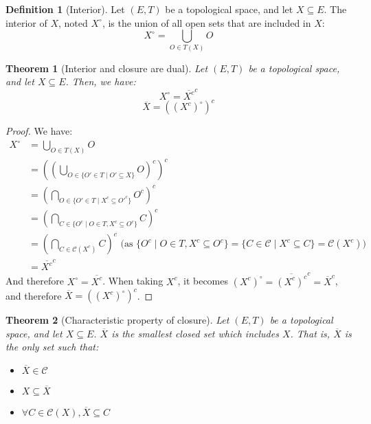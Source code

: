 \documentclass{article}
\newtheorem{theorem}{Theorem}[section]
\theoremstyle{definition}
\newtheorem{definition}{Definition}[section]
\theoremstyle{remark}
\theoremstyle{example}
\theoremstyle{notation}
\newcommand{\inter}[1]{{{#1}^\circ}}
\newcommand{\closed}{\mathcal{C}}
\newcommand{\lr}[1]{\left(#1\right)}
\begin{document}
\begin{definition}[Interior]
		Let $(E, T)$ be a topological space, and let $X \subseteq E$. The interior of $X$, noted $\inter{X}$, is the union of all open sets that are included in $X$:
				$$\inter{X} = \bigcup_{O \in T(X)} O$$
\end{definition}

\begin{theorem}[Interior and closure are dual]
		Let $(E, T)$ be a topological space, and let $X \subseteq E$. Then, we have:
				$$\inter{X} = \overline{X^c}^c$$
				$$\overline{X} = (\inter{(X^c)})^c$$
\end{theorem}

\begin{proof}
		We have:
		\begin{align*}
				\inter{X} &= \bigcup_{O \in T(X)} O\\
						  &= \lr{\lr{\bigcup_{O \in \{O' \in T \mid O' \subseteq X\}} O}^c}^c\\
						  &= \lr{\bigcap_{O \in \{O' \in T \mid X^c \subseteq O'^c\}} O^c}^c\\
						  &= \lr{\bigcap_{C \in \{O^c \mid O \in T, X^c \subseteq O^c\}} C}^c\\
						  &= \lr{\bigcap_{C \in \closed(X^c)} C}^c \text{ (as $\{O^c \mid O \in T, X^c \subseteq O^c\} = \{C \in \closed \mid X^c \subseteq C\} = \closed(X^c)$)}\\
						  &= \overline{X^c}^c
		\end{align*}
		And therefore $\inter{X} = \overline{X^c}$. When taking $X^c$, it becomes $\inter{(X^c)} = \overline{(X^c)^c}^c = \overline{X}^c$, and therefore $\overline{X} = (\inter{(X^c)})^c$.
\end{proof}

\begin{theorem}[Characteristic property of closure] \label{thm:closure-charac}
		Let $(E, T)$ be a topological space, and let $X \subseteq E$. $\overline{X}$ is the smallest closed set which includes $X$. That is, $\overline{X}$ is the only set such that:
		\begin{itemize}
				\item $\overline{X} \in \closed$
				\item $X \subseteq \overline{X}$
				\item $\forall C \in \closed(X), \overline{X} \subseteq C$
		\end{itemize}
\end{theorem}
\end{document}

